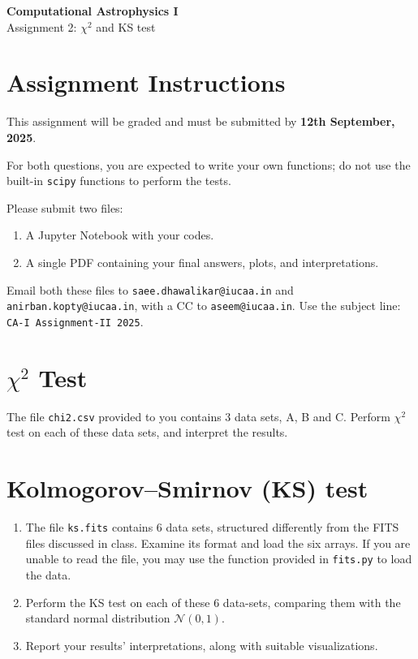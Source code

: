 \documentclass[12pt]{article}
\begin{document}
\begin{center}
    \Large \textbf{Computational Astrophysics I}\\[6pt]
    \large Assignment 2: $\chi^2$ and KS test\\[6pt]
\end{center}


\bigskip


\section*{Assignment Instructions}
%

This assignment will be graded and must be submitted by \textbf{12th September, 2025}.

\vspace{10pt}

For both questions, you are expected to write your own functions; do not use the built-in \texttt{scipy} functions to perform the tests.

\vspace{10pt}

Please submit two files:
\begin{enumerate}
    \item  A Jupyter Notebook with your codes.
    \item  A single PDF containing your final answers, plots, and interpretations.
\end{enumerate}
Email both these files to \texttt{saee.dhawalikar@iucaa.in} and \texttt{anirban.kopty@iucaa.in}, with a CC to \texttt{aseem@iucaa.in}.
Use the subject line: \texttt{CA-I Assignment-II 2025}.

\section{$\chi^2$ Test}

The file \texttt{chi2.csv} provided to you contains $3$ data sets, A, B and C. Perform $\chi^2$ test on each of these data sets, and interpret the results.


\section{Kolmogorov–Smirnov (KS) test}

\begin{enumerate}
    \item The file \texttt{ks.fits} contains $6$ data sets, structured differently from the FITS files discussed in class. Examine its format and load the six arrays. If you are unable to read the file, you may use the function provided in \texttt{fits.py} to load the data.
    \item Perform the KS test on each of these $6$ data-sets, comparing them with the standard normal distribution $\mathcal{N}(0,1)$.
    \item Report your results' interpretations, along with suitable visualizations.
\end{enumerate}
\end{document}

